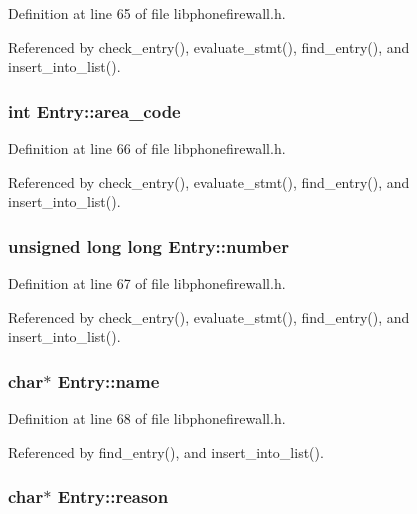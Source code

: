Definition at line 65 of file libphonefirewall.h.

Referenced by check\_\-entry(), evaluate\_\-stmt(), find\_\-entry(), and insert\_\-into\_\-list().\hypertarget{structEntry_9de7b96e5b65796bd35e9dc730dcd8b3}{
\subsubsection{\setlength{\rightskip}{0pt plus 5cm}int {\bf Entry::area\_\-code}}}
\label{structEntry_9de7b96e5b65796bd35e9dc730dcd8b3}




Definition at line 66 of file libphonefirewall.h.

Referenced by check\_\-entry(), evaluate\_\-stmt(), find\_\-entry(), and insert\_\-into\_\-list().\hypertarget{structEntry_1f2177afed89936f82c130ae13fb107c}{
\subsubsection{\setlength{\rightskip}{0pt plus 5cm}unsigned long long {\bf Entry::number}}}
\label{structEntry_1f2177afed89936f82c130ae13fb107c}




Definition at line 67 of file libphonefirewall.h.

Referenced by check\_\-entry(), evaluate\_\-stmt(), find\_\-entry(), and insert\_\-into\_\-list().\hypertarget{structEntry_272e382d3efed5f970c7939742ec9603}{
\subsubsection{\setlength{\rightskip}{0pt plus 5cm}char$\ast$ {\bf Entry::name}}}
\label{structEntry_272e382d3efed5f970c7939742ec9603}




Definition at line 68 of file libphonefirewall.h.

Referenced by find\_\-entry(), and insert\_\-into\_\-list().\hypertarget{structEntry_2082cdbb815dfa8b81309cd395d32986}{
\subsubsection{\setlength{\rightskip}{0pt plus 5cm}char$\ast$ {\bf Entry::reason}}}
\label{structEntry_2082cdbb815dfa8b81309cd395d32986}




